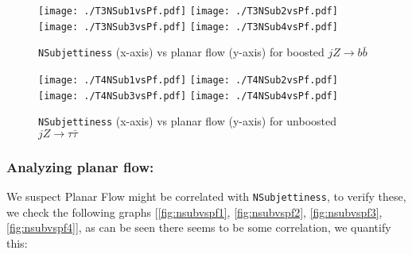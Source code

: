 \begin{figure}[H]
    \begin{center}
        \texttt{[image: ./T3NSub1vsPf.pdf]}
        \texttt{[image: ./T3NSub2vsPf.pdf]}\\
        \texttt{[image: ./T3NSub3vsPf.pdf]}
        \texttt{[image: ./T3NSub4vsPf.pdf]}\\
        \caption{ {\tt NSubjettiness} (x-axis) vs planar flow (y-axis) for boosted $jZ\rightarrow b \bar{b}$ }
        \label{fig:nsubvspf3}
    \end{center}
\end{figure}

\begin{figure}[H]
    \begin{center}
        \texttt{[image: ./T4NSub1vsPf.pdf]}
        \texttt{[image: ./T4NSub2vsPf.pdf]}\\
        \texttt{[image: ./T4NSub3vsPf.pdf]}
        \texttt{[image: ./T4NSub4vsPf.pdf]}\\
        \caption{ {\tt NSubjettiness} (x-axis) vs planar flow (y-axis) for unboosted $jZ\rightarrow \tau \bar{\tau}$ }
        \label{fig:nsubvspf4}
    \end{center}
\end{figure}

{\newpage}

\subsubsection{Analyzing planar flow:}

We suspect Planar Flow might be correlated with {\tt NSubjettiness}, to verify these, we check the following graphs [\autoref{fig:nsubvspf1}, \autoref{fig:nsubvspf2}, \autoref{fig:nsubvspf3}, \autoref{fig:nsubvspf4}], as can be seen there seems to be some correlation, we quantify this:

